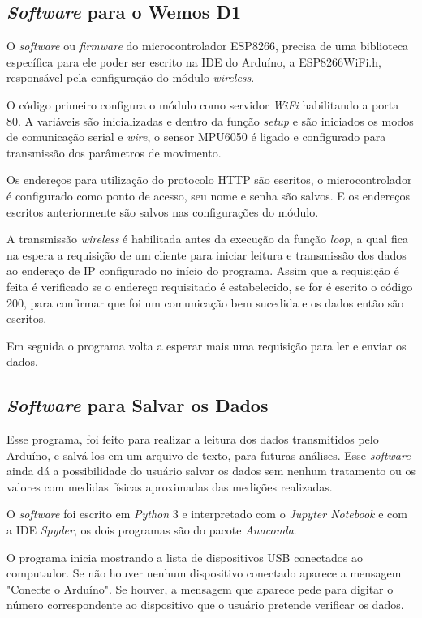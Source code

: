 \subsection{\textit{Software} para o Wemos D1}

	O \textit{software} ou \textit{firmware} do microcontrolador ESP8266,  precisa de uma biblioteca específica para ele poder ser escrito na IDE do Arduíno, a ESP8266WiFi.h, responsável pela configuração do módulo \textit{wireless}. 
	
	O código primeiro configura o módulo como servidor \textit{WiFi} habilitando a porta 80.  A variáveis são inicializadas e dentro da função \textit{setup} e são iniciados os modos de comunicação serial e \textit{wire},  o sensor MPU6050 é ligado e configurado para transmissão  dos parâmetros de movimento. 
	
	Os endereços para utilização do protocolo HTTP são escritos,  o microcontrolador é configurado como ponto de acesso, seu nome e senha são salvos. E os endereços escritos anteriormente são salvos nas configurações do módulo.

	A transmissão \textit{wireless} é habilitada antes da execução da função \textit{loop}, a qual fica na espera a requisição de um cliente para iniciar leitura e transmissão dos dados ao endereço de IP configurado no início do programa. Assim que a requisição é feita é verificado se o endereço requisitado é estabelecido, se for é escrito o código 200, para confirmar que foi um comunicação bem sucedida e os dados então são escritos.
	
	Em seguida o programa volta a esperar mais uma requisição para ler e enviar os dados.
		 
\subsection{\textit{Software} para Salvar os Dados}

		Esse programa, foi feito para realizar a leitura dos dados transmitidos pelo Arduíno, e salvá-los em um arquivo de texto, para futuras análises. Esse \textit{software} ainda dá a possibilidade do usuário salvar os dados sem nenhum tratamento ou os valores com medidas físicas aproximadas das medições realizadas. 
		
		O \textit{software} foi escrito em \textit{Python} 3 e interpretado com o \textit{Jupyter Notebook} e com a IDE \textit{Spyder}, os dois programas são do pacote \textit{Anaconda}. 
		
		O programa inicia mostrando a lista de dispositivos USB conectados ao computador. Se não houver nenhum dispositivo conectado aparece a mensagem "Conecte o Arduíno". Se houver, a mensagem que aparece pede para digitar o número correspondente ao dispositivo que o usuário pretende verificar os dados. 
		
